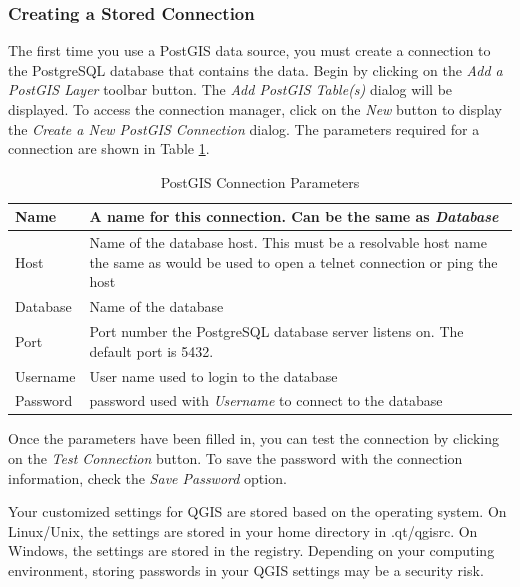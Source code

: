 \documentclass[10pt,english]{article}
\newcommand\qgistip[1]{\raggedright\small{#1}}
\begin{document}
\begin{onehalfspace}
\subsubsection{Creating a Stored Connection}
The first time you use a PostGIS data source, you must create a connection to the PostgreSQL database that contains the data. Begin by clicking on the \textit{Add a PostGIS Layer} toolbar button. The \textsl{Add PostGIS Table(s)} dialog will be displayed. To access the connection manager, click on the \textsl{New} button to display the \textsl{Create a New PostGIS Connection} dialog. The parameters required for a connection are shown in Table \ref{tab:postgis_connection_parms}.
\begin{table}[h]
\centering
\caption{PostGIS Connection Parameters}\label{tab:postgis_connection_parms}\medskip
 \begin{tabular}{|l|p{5in}|}
\hline Name & A name for this connection. Can be the same as \textsl{Database} \\
\hline Host & Name of the database host. This must be a resolvable host name the same as would be used to open a telnet connection or ping the host \\
\hline Database & Name of the database  \\
\hline Port & Port number the PostgreSQL database server listens on. The default port is 5432.\\
\hline Username & User name used to login to the database \\
\hline Password & password used with \textsl{Username} to connect to the database\\
\hline
\end{tabular}
\end{table}
Once the parameters have been filled in, you can test the connection by clicking on the \textsl{Test Connection} button. To save the password with the connection information, check the \textsl{Save Password} option.
\begin{Tip}\caption{\textsc{QGIS User Settings and Security}}
\qgistip{Your customized settings for QGIS are stored based on the operating system. On Linux/Unix, the settings are stored in your home directory in .qt/qgisrc. On Windows, the settings are stored in the registry. Depending on your computing environment, storing passwords in your QGIS settings may be a security risk.
}
\end{Tip}

\end{onehalfspace}
\end{document}

